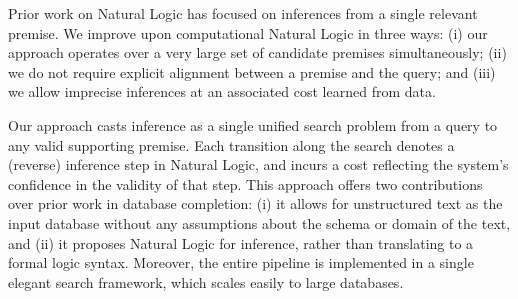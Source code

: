 Prior work on Natural Logic has focused on inferences from a single
  relevant premise.
We improve upon computational Natural Logic in three ways:
  (i) our approach operates over a very large set of
    candidate premises simultaneously;
  (ii) we do not require explicit alignment between a premise 
    and the query;
  and (iii) we allow imprecise inferences at an
    associated cost learned from data.


Our approach casts inference as a single unified search problem from 
  a query to any valid supporting premise.
Each transition along the search denotes a (reverse) inference step 
  in Natural Logic, and incurs a cost reflecting the system's confidence
  in the validity of that step.
This approach offers two contributions over prior work in
  database completion:
  (i) it allows for unstructured text as the input database without
    any assumptions about the schema or domain of the text,
  and (ii) it proposes Natural Logic for inference, rather than
    translating to a formal logic syntax.
Moreover, the entire pipeline is implemented 
  in a single elegant search framework, which scales easily to large
  databases.

%
%

